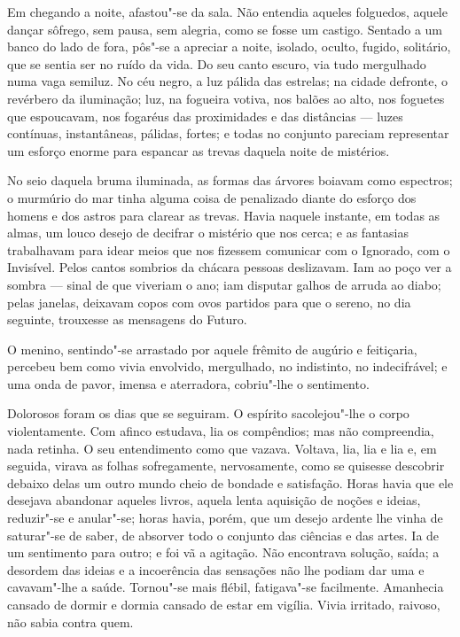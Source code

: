 Em chegando a noite, afastou"-se da sala. Não entendia aqueles folguedos,
aquele dançar sôfrego, sem pausa, sem alegria, como se fosse um castigo.
Sentado a um banco do lado de fora, pôs"-se a apreciar a noite, isolado,
oculto, fugido, solitário, que se sentia ser no ruído da vida. Do seu
canto escuro, via tudo mergulhado numa vaga semiluz. No céu negro, a luz
pálida das estrelas; na cidade defronte, o revérbero da iluminação; luz,
na fogueira votiva, nos balões ao alto, nos foguetes que espoucavam, nos
fogaréus das proximidades e das distâncias --- luzes contínuas,
instantâneas, pálidas, fortes; e todas no conjunto pareciam representar
um esforço enorme para espancar as trevas daquela noite de mistérios.

No seio daquela bruma iluminada, as formas das árvores boiavam como
espectros; o murmúrio do mar tinha alguma coisa de penalizado diante do
esforço dos homens e dos astros para clarear as trevas. Havia naquele
instante, em todas as almas, um louco desejo de decifrar o mistério que
nos cerca; e as fantasias trabalhavam para idear meios que nos fizessem
comunicar com o Ignorado, com o Invisível. Pelos cantos sombrios da
chácara pessoas deslizavam. Iam ao poço ver a sombra --- sinal de que
viveriam o ano; iam disputar galhos de arruda ao diabo; pelas janelas,
deixavam copos com ovos partidos para que o sereno, no dia seguinte,
trouxesse as mensagens do Futuro.

O menino, sentindo"-se arrastado por aquele frêmito de augúrio e
feitiçaria, percebeu bem como vivia envolvido, mergulhado, no
indistinto, no indecifrável; e uma onda de pavor, imensa e aterradora,
cobriu"-lhe o sentimento.

Dolorosos foram os dias que se seguiram. O espírito sacolejou"-lhe o
corpo violentamente. Com afinco estudava, lia os compêndios; mas não
compreendia, nada retinha. O seu entendimento como que vazava. Voltava,
lia, lia e lia e, em seguida, virava as folhas sofregamente,
nervosamente, como se quisesse descobrir debaixo delas um outro mundo
cheio de bondade e satisfação. Horas havia que ele desejava abandonar
aqueles livros, aquela lenta aquisição de noções e ideias, reduzir"-se e
anular"-se; horas havia, porém, que um desejo ardente lhe vinha de
saturar"-se de saber, de absorver todo o conjunto das ciências e das
artes. Ia de um sentimento para outro; e foi vã a agitação. Não
encontrava solução, saída; a desordem das ideias e a incoerência das
sensações não lhe podiam dar uma e cavavam"-lhe a saúde. Tornou"-se mais
flébil, fatigava"-se facilmente. Amanhecia cansado de dormir e dormia
cansado de estar em vigília. Vivia irritado, raivoso, não sabia contra
quem.

